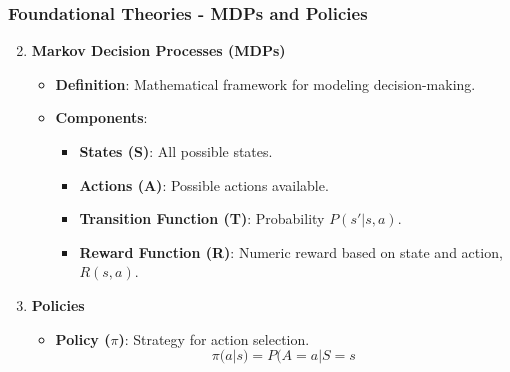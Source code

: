 \documentclass[aspectratio=169]{beamer}
\begin{document}
\begin{frame}[fragile]
    \frametitle{Foundational Theories - MDPs and Policies}
    \begin{enumerate}
        \setcounter{enumi}{1}
        \item \textbf{Markov Decision Processes (MDPs)}
        \begin{itemize}
            \item \textbf{Definition}: Mathematical framework for modeling decision-making.
            \item \textbf{Components}:
            \begin{itemize}
                \item \textbf{States (S)}: All possible states.
                \item \textbf{Actions (A)}: Possible actions available.
                \item \textbf{Transition Function (T)}: Probability \(P(s' | s, a)\).
                \item \textbf{Reward Function (R)}: Numeric reward based on state and action, \(R(s, a)\).
            \end{itemize}
        \end{itemize}

        \item \textbf{Policies}
        \begin{itemize}
            \item \textbf{Policy (\(\pi\))}: Strategy for action selection. 
            \[
            \pi(a | s) = P(A = a | S = s
            \]
        \end{itemize}
    \end{enumerate}
\end{frame}
\end{document}
